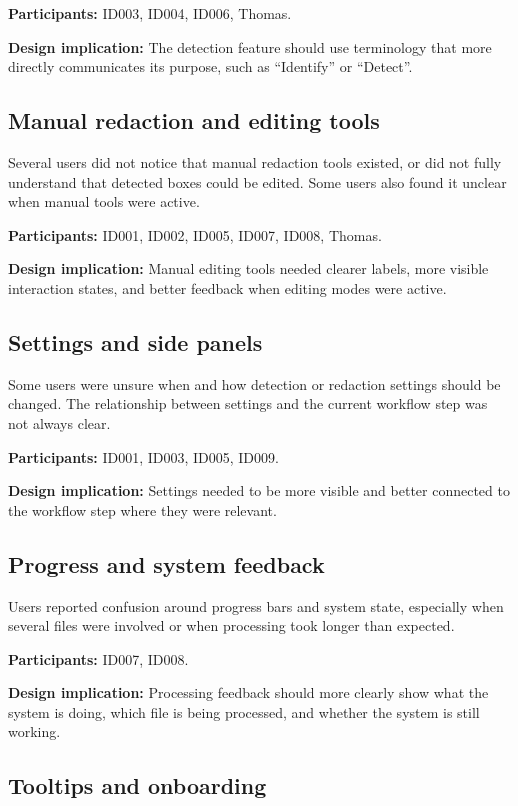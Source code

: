 \textbf{Participants:} ID003, ID004, ID006, Thomas.

\textbf{Design implication:} The detection feature should use terminology that
more directly communicates its purpose, such as ``Identify'' or ``Detect''.

\subsection*{Manual redaction and editing tools}

Several users did not notice that manual redaction tools existed, or did not
fully understand that detected boxes could be edited. Some users also found it
unclear when manual tools were active.

\textbf{Participants:} ID001, ID002, ID005, ID007, ID008, Thomas.

\textbf{Design implication:} Manual editing tools needed clearer labels, more
visible interaction states, and better feedback when editing modes were active.

\subsection*{Settings and side panels}

Some users were unsure when and how detection or redaction settings should be
changed. The relationship between settings and the current workflow step was
not always clear.

\textbf{Participants:} ID001, ID003, ID005, ID009.

\textbf{Design implication:} Settings needed to be more visible and better
connected to the workflow step where they were relevant.

\subsection*{Progress and system feedback}

Users reported confusion around progress bars and system state, especially
when several files were involved or when processing took longer than expected.

\textbf{Participants:} ID007, ID008.

\textbf{Design implication:} Processing feedback should more clearly show what
the system is doing, which file is being processed, and whether the system is
still working.

\subsection*{Tooltips and onboarding}

